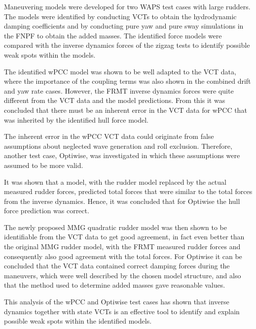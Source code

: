 %
\noindent Maneuvering models were developed for two WAPS test cases with large rudders. The models were identified by conducting VCTs to obtain the hydrodynamic damping coefficients and by conducting pure yaw and pure sway simulations in the FNPF to obtain the added masses. The identified force models were compared with the inverse dynamics forces of the zigzag tests to identify possible weak spots within the models.  

The identified wPCC model was shown to be well adapted to the VCT data, where the importance of the coupling terms was also shown in the combined drift and yaw rate cases.
However, the FRMT inverse dynamics forces were quite different from the VCT data and the model predictions. From this it was concluded that there must be an inherent error in the VCT data for wPCC that was inherited by the identified hull force model.

The inherent error in the wPCC VCT data could originate from false assumptions about neglected wave generation and roll exclusion. Therefore, another test case, Optiwise, was investigated in which these assumptions were assumed to be more valid.

It was shown that a model, with the rudder model replaced by the actual measured rudder forces, predicted total forces that were similar to the total forces from the inverse dynamics. Hence, it was concluded that for Optiwise the hull force prediction was correct.

The newly proposed MMG quadratic rudder model was then shown to be identifiable from the VCT data to get good agreement, in fact even better than the original MMG rudder model, with the FRMT measured rudder forces and consequently also good agreement with the total forces. 
For Optiwise it can be concluded that the VCT data contained correct damping forces during the maneuvers, which were well described by the chosen model structure, and also that the method used to determine added masses gave reasonable values. 

This analysis of the wPCC and Optiwise test cases has shown that inverse dynamics together with state VCTs is an effective tool to identify and explain possible weak spots within the identified models.

